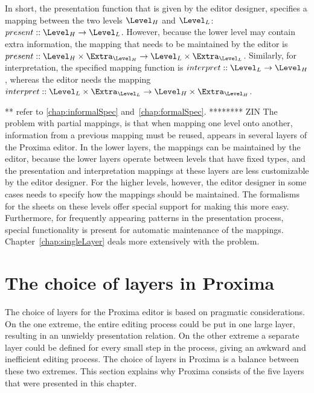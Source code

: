 In short, the presentation function that is given by the editor designer, specifies a mapping between the two levels $\Level_{H}$ and $\Level_{L}$:  $present :: \Level_{H} \rightarrow \Level_{L}$. However, because the lower level may contain extra information, the mapping that needs to be maintained by the editor is 
$present :: \Level_{H}\times \Extra_{\Level_{H}} \rightarrow \Level_{L}\times \Extra_{\Level_{L}}$. Similarly, for interpretation, the specified mapping function is 
$interpret :: \Level_{L} \rightarrow \Level_{H}$, whereas the editor needs the mapping 
$interpret :: \Level_{L} \times \Extra_{\Level_{L}} \rightarrow \Level_{H}\times \Extra_{\Level_{H}}$. 

** refer to \ref{chap:informalSpec} and~\ref{chap:formalSpec}.
******** ZIN
The problem with partial mappings, is that when mapping one level onto another, information from a previous mapping must be reused, appears in several layers of the Proxima editor. In the lower layers, the mappings can be maintained by the editor, because the lower layers operate between levels that have fixed types, and the presentation and interpretation mappings at these layers are less customizable by the editor designer. For the higher levels, however, the editor designer in some cases needs to specify how the mappings should be maintained. The formalisms for the sheets on these levels offer special support for making this more easy. Furthermore, for frequently appearing patterns in the presentation process, special functionality is present for automatic maintenance of the mappings. Chapter~\ref{chap:singleLayer} deals more extensively with the problem.
\ec

%																
%																
%																
\section{The choice of layers in Proxima}

The choice of layers for the Proxima editor is based on pragmatic considerations. On the one extreme, the entire editing process could be put in one large layer, resulting in an unwieldy presentation relation. On the other extreme a separate layer could be defined for every small step in the process, giving an awkward and inefficient editing process. The choice of layers in Proxima is a balance between these two extremes. This section explains why Proxima consists of the five layers that were presented in this chapter.

